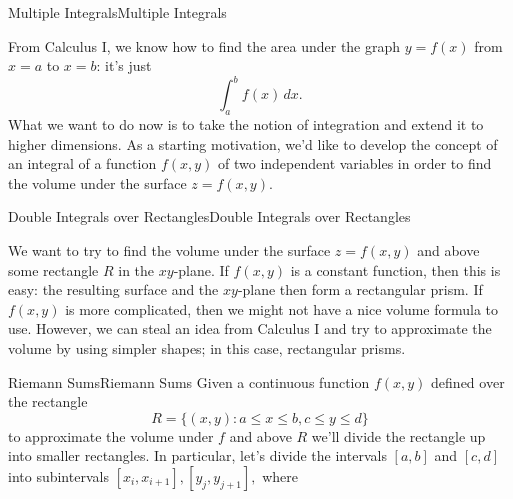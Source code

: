 \documentclass[10pt,]{book}
\numberwithin{equation}{section}
\begin{document}
\begin{chapterptx}{Multiple Integrals}{}{Multiple Integrals}{}{}\label{multiple-integrals}
\begin{introduction}{}%
\hypertarget{p-1239}{}%
From Calculus I, we know how to find the area under the graph \(y = f(x)\) from \(x = a\) to \(x = b\): it's just%
\begin{equation*}
\int_{a}^{b}f(x)\,dx.
\end{equation*}
What we want to do now is to take the notion of integration and extend it to higher dimensions. As a starting motivation, we'd like to develop the concept of an integral of a function \(f(x,y)\) of two independent variables in order to find the volume under the surface \(z = f(x,y)\).%
\end{introduction}%
%
%
\typeout{************************************************}
\typeout{************************************************}
%
\begin{sectionptx}{Double Integrals over Rectangles}{}{Double Integrals over Rectangles}{}{}\label{section-double-integrals-over-rectangles}
\begin{introduction}{}%
\hypertarget{p-1240}{}%
We want to try to find the volume under the surface \(z = f(x,y)\) and above some rectangle \(R\) in the \(xy\)-plane. If \(f(x,y)\) is a constant function, then this is easy: the resulting surface and the \(xy\)-plane then form a rectangular prism. If \(f(x,y)\) is more complicated, then we might not have a nice volume formula to use. However, we can steal an idea from Calculus I and try to approximate the volume by using simpler shapes; in this case, rectangular prisms.%
\end{introduction}%
%
%
\typeout{************************************************}
\typeout{************************************************}
%
\begin{subsectionptx}{Riemann Sums}{}{Riemann Sums}{}{}\label{subsection-riemann-sums}
\hypertarget{p-1241}{}%
Given a continuous function \(f(x,y)\) defined over the rectangle%
\begin{equation*}
R = \{(x,y) : a\leq x\leq b, c\leq y\leq d\}
\end{equation*}
to approximate the volume under \(f\) and above \(R\) we'll divide the rectangle up into smaller rectangles. In particular, let's divide the intervals \([a,b]\) and \([c,d]\) into subintervals \([x_{i},x_{i+1}], [y_{j},y_{j+1}],\) where%
\begin{align*}

\end{align*}
\end{subsectionptx}
\end{sectionptx}
\end{chapterptx}
\end{document}
